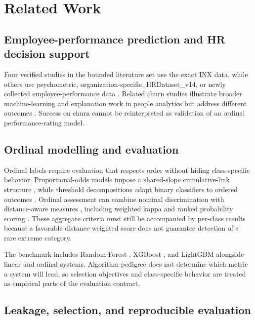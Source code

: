 \documentclass[information,article,submit,pdftex,moreauthors]{Definitions/mdpi}
\begin{document}
\section{Related Work}

\subsection{Employee-performance prediction and HR decision support}

Four verified studies in the bounded literature set use the exact INX data, while others use psychometric, organization-specific, HRDataset\_v14, or newly collected employee-performance data \cite{archana2019application,lather2019prediction,li2021employee,patel2022ranker,adeniyi2022comparison,nayem2024unbiased,putri2026klasifikasi}. Related churn studies illustrate broader machine-learning and explanation work in people analytics but address different outcomes \cite{abufaty2025integrating,chaudhary2025integrated}. Success on churn cannot be reinterpreted as validation of an ordinal performance-rating model.

\subsection{Ordinal modelling and evaluation}

Ordinal labels require evaluation that respects order without hiding class-specific behavior. Proportional-odds models impose a shared-slope cumulative-link structure \cite{mccullagh1980regression}, while threshold decompositions adapt binary classifiers to ordered outcomes \cite{frank2001simple}. Ordinal assessment can combine nominal discrimination with distance-aware measures \cite{cardoso2011measuring}, including weighted kappa \cite{cohen1968weighted} and ranked probability scoring \cite{epstein1969scoring,gneiting2007strictly}. These aggregate criteria must still be accompanied by per-class results because a favorable distance-weighted score does not guarantee detection of a rare extreme category.

The benchmark includes Random Forest \cite{breiman2001random}, XGBoost \cite{chen2016xgboost}, and LightGBM \cite{ke2017lightgbm} alongside linear and ordinal systems. Algorithm pedigree does not determine which metric a system will lead, so selection objectives and class-specific behavior are treated as empirical parts of the evaluation contract.

\subsection{Leakage, selection, and reproducible evaluation}
\end{document}
